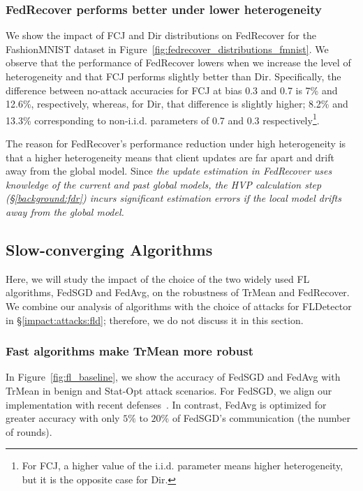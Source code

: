 \subsubsection{FedRecover performs better under lower heterogeneity}\label{impact:distributions:fdr}
We show the impact of FCJ and Dir distributions on FedRecover for the FashionMNIST dataset 
in Figure~\ref{fig:fedrecover_distributions_fmnist}.
We observe that the performance of FedRecover lowers when we increase the level of heterogeneity and that FCJ performs slightly better than Dir. Specifically, the difference between no-attack accuracies for FCJ at bias 0.3 and 0.7 is 7\% and 12.6\%, respectively, whereas, for Dir, that difference is slightly higher; 8.2\% and 13.3\% corresponding to non-i.i.d. parameters of 0.7 and 0.3 respectively\footnote{For FCJ, a higher value of the i.i.d. parameter means higher heterogeneity, but it is the opposite case for Dir.}.

The reason for FedRecover's performance reduction under high heterogeneity is that a higher heterogeneity means that client updates are far apart and drift away from the global model. Since \emph{the update estimation in FedRecover uses knowledge of the current and past global models, the HVP calculation step (\S\ref{background:fdr}) incurs significant estimation errors if the local model drifts away from the global model.}
\subsection{Slow-converging Algorithms}\label{impact:algorithm}
Here, we will study the impact of the choice of the two widely used FL algorithms, FedSGD and FedAvg, on the robustness of TrMean and FedRecover. We combine our analysis of algorithms with the choice of attacks for FLDetector in \S\ref{impact:attacks:fld}; therefore, we do not discuss it in this section.
\subsubsection{Fast algorithms make TrMean more robust}\label{impact:algorithm:trmean}
In Figure~\ref{fig:fl_baseline}, we show the accuracy of FedSGD and FedAvg with TrMean in benign and Stat-Opt attack scenarios. For FedSGD, we align our implementation with recent defenses~\cite{cao2022fedrecover,fang2020local}. In contrast, FedAvg is optimized for greater accuracy with only $5\%$ to $20\%$ of FedSGD's communication (the number of rounds).

